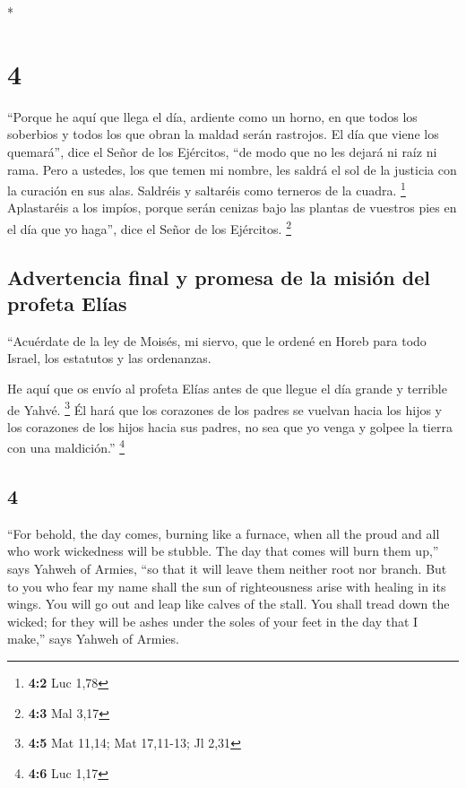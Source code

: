 \begin{paracol}{2}
\begin{otherlanguage}{english}
\end{otherlanguage}

\switchcolumn[0]*

\hypertarget{section-6}{%
\section{4}\label{section-6}}

 ``Porque he aquí que llega el día, ardiente como un
horno, en que todos los soberbios y todos los que obran la maldad serán
rastrojos. El día que viene los quemará'', dice el Señor de los
Ejércitos, ``de modo que no les dejará ni raíz ni rama. 
Pero a ustedes, los que temen mi nombre, les saldrá el sol de la
justicia con la curación en sus alas. Saldréis y saltaréis como terneros
de la cuadra. \footnote{\textbf{4:2} Luc 1,78} 
Aplastaréis a los impíos, porque serán cenizas bajo las plantas de
vuestros pies en el día que yo haga'', dice el Señor de los Ejércitos.
\footnote{\textbf{4:3} Mal 3,17}

\hypertarget{advertencia-final-y-promesa-de-la-misiuxf3n-del-profeta-eluxedas}{%
\subsection{Advertencia final y promesa de la misión del profeta
Elías}\label{advertencia-final-y-promesa-de-la-misiuxf3n-del-profeta-eluxedas}}

 ``Acuérdate de la ley de Moisés, mi siervo, que le ordené
en Horeb para todo Israel, los estatutos y las ordenanzas.

 He aquí que os envío al profeta Elías antes de que llegue
el día grande y terrible de Yahvé. \footnote{\textbf{4:5} Mat 11,14; Mat
  17,11-13; Jl 2,31}  Él hará que los corazones de los
padres se vuelvan hacia los hijos y los corazones de los hijos hacia sus
padres, no sea que yo venga y golpee la tierra con una maldición.''
\footnote{\textbf{4:6} Luc 1,17} \switchcolumn
\begin{otherlanguage}{english}

\hypertarget{section-7}{%
\section{4}\label{section-7}}

 ``For behold, the day comes, burning like a furnace, when
all the proud and all who work wickedness will be stubble. The day that
comes will burn them up,'' says Yahweh of Armies, ``so that it will
leave them neither root nor branch.  But to you who fear
my name shall the sun of righteousness arise with healing in its wings.
You will go out and leap like calves of the stall.  You
shall tread down the wicked; for they will be ashes under the soles of
your feet in the day that I make,'' says Yahweh of Armies.


\end{otherlanguage}
\end{paracol}
